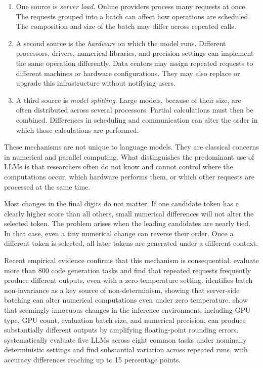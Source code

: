 \documentclass[11pt]{article}
\begin{document}
\begin{enumerate}
\setlength\itemsep{-0.3em}
    \item One source is \textit{server load}. Online providers process many requests at once. The requests grouped into a batch can affect how operations are scheduled. The composition and size of the batch may differ across repeated calls. \medskip
    \item A second source is the \textit{hardware} on which the model runs. Different processors, drivers, numerical libraries, and precision settings can implement the same operation differently. Data centers may assign repeated requests to different machines or hardware configurations. They may also replace or upgrade this infrastructure without notifying users. \medskip
    \item A third source is \textit{model splitting}. Large models, because of their size, are often distributed across several processors. Partial calculations must then be combined. Differences in scheduling and communication can alter the order in which those calculations are performed.
\end{enumerate}

These mechanisms are not unique to language models. They are classical concerns in numerical and parallel computing. What distinguishes the predominant use of LLMs is that researchers often do not know and cannot control where the computations occur, which hardware performs them, or which other requests are processed at the same time.\medskip

Most changes in the final digits do not matter. If one candidate token has a clearly higher score than all others, small numerical differences will not alter the selected token. The problem arises when the leading candidates are nearly tied. In that case, even a tiny numerical change can reverse their order. Once a different token is selected, all later tokens are generated under a different context.\medskip

Recent empirical evidence confirms that this mechanism is consequential. \citet{ouyang2024} evaluate more than 800 code generation tasks and find that repeated requests frequently produce different outputs, even with a zero-temperature setting. \citet{he2025} identifies batch non-invariance as a key source of non-determinism, showing that server-side batching can alter numerical computations even under zero temperature. \citet{li2025} show that seemingly innocuous changes in the inference environment, including GPU type, GPU count, evaluation batch size, and numerical precision, can produce substantially different outputs by amplifying floating-point rounding errors. \citet{atil2024} systematically evaluate five LLMs across eight common tasks under nominally deterministic settings and find substantial variation across repeated runs, with accuracy differences reaching up to 15 percentage points.
\end{document}
